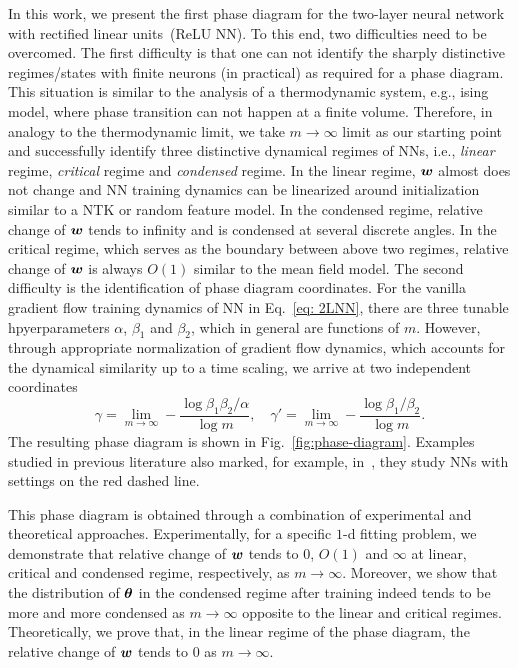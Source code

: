 \documentclass{article}
\begin{document}
In this work, we present the first phase diagram for the two-layer neural network with  rectified linear units~(ReLU NN). To this end, two difficulties need to be overcomed. The first difficulty is that one can not identify the sharply distinctive regimes/states with finite neurons (in practical) as required for a phase diagram. This situation is similar to the analysis of a thermodynamic system, e.g., ising model, where phase transition can not happen at a finite volume. Therefore, in analogy to the thermodynamic limit, we take $m\to\infty$ limit as our starting point and successfully identify three distinctive dynamical regimes of NNs, i.e., \emph{linear} regime, \emph{critical} regime and \emph{condensed} regime. In the linear regime, $\bm{w}$ almost does not change and NN training dynamics can be linearized around initialization similar to a NTK or random feature model. In the condensed regime, relative change of $\bm{w}$ tends to infinity and is condensed at several discrete angles. In the critical regime, which serves as the boundary between above two regimes, relative change of $\bm{w}$ is always $O(1)$ similar to the mean field model. The second difficulty is the identification of phase diagram coordinates. For the vanilla gradient flow training dynamics of NN in Eq.~\eqref{eq: 2LNN}, there are three tunable hpyerparameters $\alpha$, $\beta_1$ and $\beta_2$, which in general are functions of $m$. However, through appropriate normalization of gradient flow dynamics, which accounts for the dynamical similarity up to a time scaling, we arrive at two independent coordinates 
\begin{equation}
    \gamma=\lim\limits_{m\to\infty}-\frac{\log\beta_1\beta_2/\alpha}{\log m}, \quad \gamma'=\lim\limits_{m\to\infty}-\frac{\log\beta_1/\beta_2}{\log m}.
\end{equation}
The resulting phase diagram is shown in Fig.~\ref{fig:phase-diagram}. Examples studied in previous literature also marked, for example, in~\cite{e2020comparative}, they study NNs with settings on the red dashed line.

This phase diagram is obtained through a combination of experimental and theoretical approaches. Experimentally, for a specific $1$-d fitting problem, we demonstrate that relative change of $\bm{w}$ tends to $0$, $O(1)$ and $\infty$ at linear, critical and condensed regime, respectively, as $m\to\infty$. Moreover, we show that the distribution of $\bm{\theta}$ in the condensed regime after training indeed tends to be more and more condensed as $m\to\infty$ opposite to the linear and critical regimes. Theoretically, we prove that, in the linear regime of the phase diagram, the relative change of $\bm{w}$ tends to $0$ as $m\to\infty$.
\end{document}
